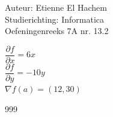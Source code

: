 \documentclass[a4paper]{article}
\begin{document}
  
\noindent \large Auteur: Etienne El Hachem \\
\noindent \large Studierichting: Informatica\\
\noindent \large Oefeningenreeks 7A nr. 13.2 \\

\medskip

\normalsize

$ \dfrac{\partial f}{\partial x}  = 6x $\\

$ \dfrac{\partial f}{\partial y} = -10y $\\

$ \nabla f(a) = (12, 30) $\\

\begin{thebibliography}{999}
\end{thebibliography}
\end{document}
